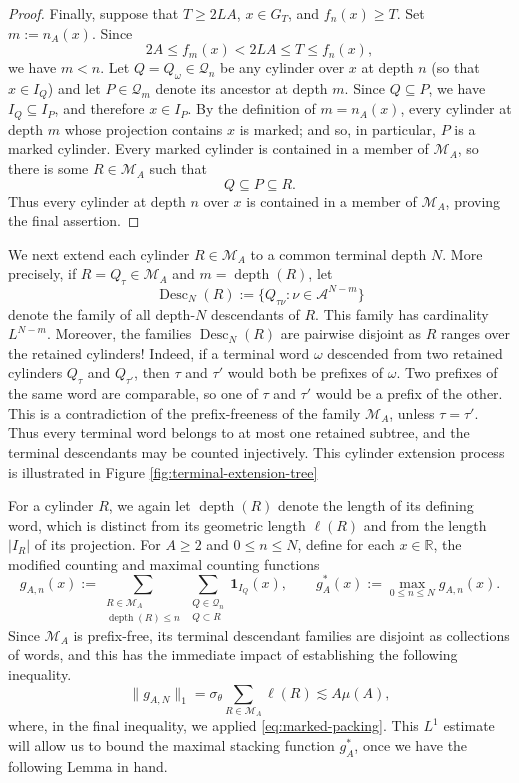 \documentclass[12pt]{amsart}
\numberwithin{equation}{section}
\newcommand{\Q}{\mathbb Q}
\begin{document}
\begin{proof}
Finally, suppose that $T\geq 2LA$, $x\in G_T$, and
$f_n(x)\geq T$.  Set $m:=n_A(x)$.  Since
$$
2A\leq f_m(x)<2LA\leq T\leq f_n(x),
$$
we have $m<n$.  Let $Q=Q_\omega\in\mathscr Q_n$ be any
cylinder over $x$ at depth $n$ (so that $x\in I_Q$) and let
$
P \in \mathscr Q_m
$
denote its ancestor at depth $m$.  Since $Q\subseteq P$, we have
$I_Q\subseteq I_P$, and therefore $x\in I_P$.  By the definition
of $m=n_A(x)$, every cylinder at depth $m$ whose projection contains
$x$ is marked; and so, in particular, $P$ is a marked cylinder.  Every marked cylinder is contained in a member of $\mathscr M_A$, so there is
some $R\in\mathscr M_A$ such that
\[
Q\subseteq P\subseteq R.
\]
Thus every cylinder at depth $n$ over $x$ is contained in a member of
$\mathscr M_A$, proving the final assertion.
\end{proof}



We next extend each cylinder $R \in \mathscr{M}_A$ to a common terminal depth $N$.  More precisely, if
$R=Q_\tau \in \mathscr{M}_A$ and $m=\operatorname{depth}(R)$, let
\[
 \operatorname{Desc}_N(R)
 :=
 \{Q_{\tau\nu}:\nu\in\mathcal A^{N-m}\}
\]
denote the family of all depth-$N$ descendants of $R$.  This family has
cardinality $L^{N-m}$.  Moreover, the families
$\operatorname{Desc}_N(R)$ are pairwise disjoint as $R$ ranges over the
retained cylinders!  Indeed, if a terminal word $\omega$ descended from two
retained cylinders $Q_\tau$ and $Q_{\tau'}$, then $\tau$ and $\tau'$ would
both be prefixes of $\omega$.  Two prefixes of the same word are comparable,
so one of $\tau$ and $\tau'$ would be a prefix of the other. This is a contradiction of the prefix-freeness of the family $\mathscr{M}_A$, unless $\tau=\tau'$.  Thus every terminal word belongs to at most one retained subtree, and the terminal descendants may be counted
injectively. This cylinder extension process is illustrated in Figure \ref{fig:terminal-extension-tree}

For a cylinder $R$, we again let $\operatorname{depth}(R)$ denote the length of its defining word, which is distinct from its geometric length $\ell(R)$ and from the length $|I_R|$ of its projection.  For $A\geq2$ and $0\leq n\leq N$, define for each $x \in \mathbb{R}$, the modified counting and maximal counting functions
\begin{equation}\label{eq:green-counting}
 g_{A,n}(x)
 :=\sum_{\substack{R\in\mathscr M_A\\\operatorname{depth}(R)\leq n}}
   \sum_{\substack{Q\in\mathscr Q_n\\Q\subset R}}\mathbf1_{I_Q}(x),
 \qquad
 g_A^*(x):=\max_{0\leq n\leq N}g_{A,n}(x).
\end{equation}
Since $\mathscr M_A$ is prefix-free, its terminal descendant families are disjoint as collections of words, and this has the immediate impact of establishing the following inequality.
\begin{equation}\label{eq:green-L1}
 \|g_{A,N}\|_1
 =\sigma_\theta\sum_{R\in\mathscr M_A}\ell(R)
 \lesssim A\mu(A),
\end{equation}
where, in the final inequality, we applied \eqref{eq:marked-packing}. This $L^1$ estimate will allow us to bound the maximal stacking function $g_A^*$, once we have the following Lemma in hand.
\end{document}
